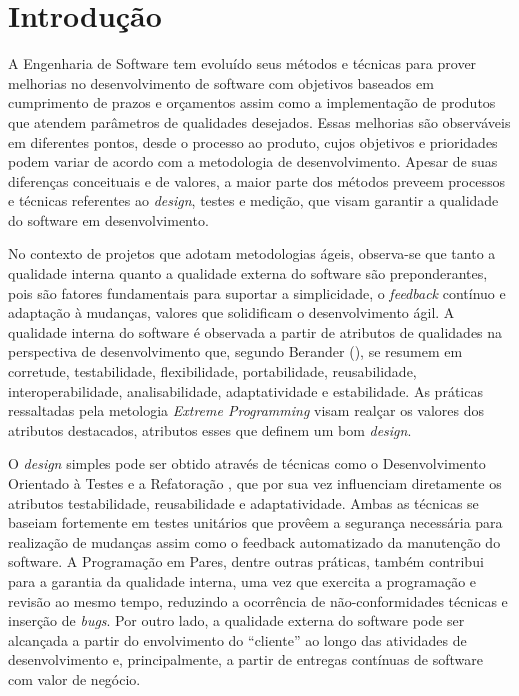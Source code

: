 \chapter{Introdução}
\label{cap-introducao}

A Engenharia de Software tem evoluído seus métodos e técnicas para prover melhorias no desenvolvimento de software com objetivos baseados em cumprimento de prazos e orçamentos assim como a implementação de produtos que atendem parâmetros de qualidades desejados. Essas melhorias são observáveis em diferentes pontos, desde o processo ao produto, cujos objetivos e prioridades podem variar de acordo com a metodologia de desenvolvimento.
%
Apesar de suas diferenças conceituais e de valores, a maior parte dos métodos preveem processos e técnicas referentes ao \emph{design}, testes e medição, que visam garantir a qualidade do software em desenvolvimento.


No contexto de projetos que adotam metodologias ágeis, observa-se que tanto a qualidade interna quanto a qualidade externa do software são preponderantes, pois são fatores fundamentais para suportar a simplicidade, o \emph{feedback} contínuo e adaptação à mudanças, valores que solidificam o desenvolvimento ágil.
%
A qualidade interna do software é observada a partir de atributos de qualidades na perspectiva de desenvolvimento que, segundo Berander (\citeyear{berander2005}), se resumem em corretude, testabilidade, flexibilidade, portabilidade, reusabilidade, interoperabilidade, analisabilidade, adaptatividade e estabilidade. As práticas ressaltadas pela metologia \emph{Extreme Programming} \cite{beck2000} visam realçar os valores dos atributos destacados, atributos esses que definem um bom \emph{design}.

%
O \emph{design} simples pode ser obtido através de técnicas como o Desenvolvimento Orientado à Testes \cite{beck2002} e a Refatoração \cite{fowler1999}, que por sua vez influenciam diretamente os atributos testabilidade, reusabilidade e adaptatividade. Ambas as técnicas se baseiam fortemente em testes unitários que provêem a segurança necessária para realização de mudanças assim como o feedback automatizado da manutenção do software.
%
A Programação em Pares, dentre outras práticas, também contribui para a garantia da qualidade interna, uma vez que exercita a programação e revisão ao mesmo tempo, reduzindo a ocorrência de não-conformidades técnicas e inserção de \emph{bugs}. Por outro lado, a qualidade externa do software pode ser alcançada a partir do envolvimento do ``cliente'' ao longo das atividades de desenvolvimento e, principalmente, a partir de entregas contínuas de software com valor de negócio.


